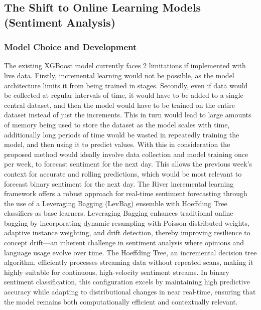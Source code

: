 \documentclass[pdflatex,sn-mathphys-num]{sn-jnl}%
\begin{document}
\subsection{The Shift to Online Learning Models (Sentiment Analysis)}
\subsubsection{Model Choice and Development}
The existing XGBoost model currently faces 2 limitations if implemented with live data. Firstly, incremental learning would not be possible, as the model architecture limits it from being trained in stages. Secondly, even if data would be collected at regular intervals of time, it would have to be added to a single central dataset, and then the model would have to be trained on the entire dataset instead of just the increments. This in turn would lead to large amounts of memory being used to store the dataset as the model scales with time, additionally long periods of time would be wasted in repeatedly training the model, and then using it to predict values. With this in consideration the proposed method would ideally involve data collection and model training once per week, to forecast sentiment for the next day. This allows the previous week’s context for accurate and rolling predictions, which would be most relevant to forecast binary sentiment for the next day.
The River incremental learning framework offers a robust approach for real-time sentiment forecasting through the use of a Leveraging Bagging (LevBag) ensemble with Hoeffding Tree classifiers as base learners. Leveraging Bagging enhances traditional online bagging by incorporating dynamic resampling with Poisson-distributed weights, adaptive instance weighting, and drift detection, thereby improving resilience to concept drift—an inherent challenge in sentiment analysis where opinions and language usage evolve over time. The Hoeffding Tree, an incremental decision tree algorithm, efficiently processes streaming data without repeated scans, making it highly suitable for continuous, high-velocity sentiment streams. In binary sentiment classification, this configuration excels by maintaining high predictive accuracy while adapting to distributional changes in near real-time, ensuring that the model remains both computationally efficient and contextually relevant.
\end{document}
